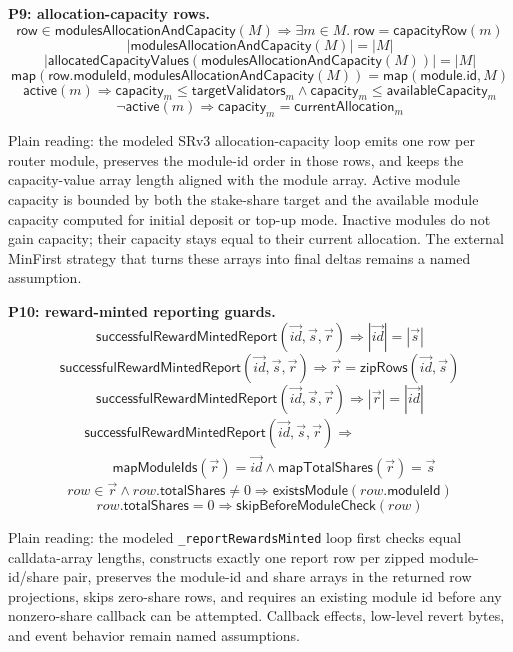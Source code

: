 \medskip
\noindent\textbf{P9: allocation-capacity rows.}
\[
  \mathsf{row} \in
  \mathsf{modulesAllocationAndCapacity}(M)
  \Rightarrow
  \exists m \in M.\ \mathsf{row} = \mathsf{capacityRow}(m)
\]
\[
  |\mathsf{modulesAllocationAndCapacity}(M)| = |M|
\]
\[
  |\mathsf{allocatedCapacityValues}(\mathsf{modulesAllocationAndCapacity}(M))|
  = |M|
\]
\[
  \mathsf{map}(\mathsf{row.moduleId},
    \mathsf{modulesAllocationAndCapacity}(M))
  =
  \mathsf{map}(\mathsf{module.id},M)
\]
\[
  \mathsf{active}(m)
  \Rightarrow
  \mathsf{capacity}_m \leq \mathsf{targetValidators}_m
  \land
  \mathsf{capacity}_m \leq \mathsf{availableCapacity}_m
\]
\[
  \neg\mathsf{active}(m)
  \Rightarrow
  \mathsf{capacity}_m = \mathsf{currentAllocation}_m
\]

\noindent Plain reading: the modeled SRv3 allocation-capacity loop emits one row
per router module, preserves the module-id order in those rows, and keeps the
capacity-value array length aligned with the module array. Active module
capacity is bounded by both the stake-share target and the available module
capacity computed for initial deposit or top-up mode. Inactive modules do not
gain capacity; their capacity stays equal to their current allocation. The
external MinFirst strategy that turns these arrays into final deltas remains a
named assumption.

\medskip
\noindent\textbf{P10: reward-minted reporting guards.}
\[
  \mathsf{successfulRewardMintedReport}(\vec{id},\vec{s},\vec{r})
  \Rightarrow
  |\vec{id}| = |\vec{s}|
\]
\[
  \mathsf{successfulRewardMintedReport}(\vec{id},\vec{s},\vec{r})
  \Rightarrow
  \vec{r} = \mathsf{zipRows}(\vec{id},\vec{s})
\]
\[
  \mathsf{successfulRewardMintedReport}(\vec{id},\vec{s},\vec{r})
  \Rightarrow
  |\vec{r}| = |\vec{id}|
\]
\[
  \begin{array}{l}
  \mathsf{successfulRewardMintedReport}(\vec{id},\vec{s},\vec{r})
  \Rightarrow \\
  \qquad
  \mathsf{mapModuleIds}(\vec{r}) = \vec{id}
  \land
  \mathsf{mapTotalShares}(\vec{r}) = \vec{s}
  \end{array}
\]
\[
  row \in \vec{r} \land row.\mathsf{totalShares} \neq 0
  \Rightarrow
  \mathsf{existsModule}(row.\mathsf{moduleId})
\]
\[
  row.\mathsf{totalShares} = 0
  \Rightarrow
  \mathsf{skipBeforeModuleCheck}(row)
\]

\noindent Plain reading: the modeled \texttt{\_reportRewardsMinted} loop first
checks equal calldata-array lengths, constructs exactly one report row per
zipped module-id/share pair, preserves the module-id and share arrays in the
returned row projections, skips zero-share rows, and requires an existing module
id before any nonzero-share callback can be attempted. Callback effects,
low-level revert bytes, and event behavior remain named assumptions.

